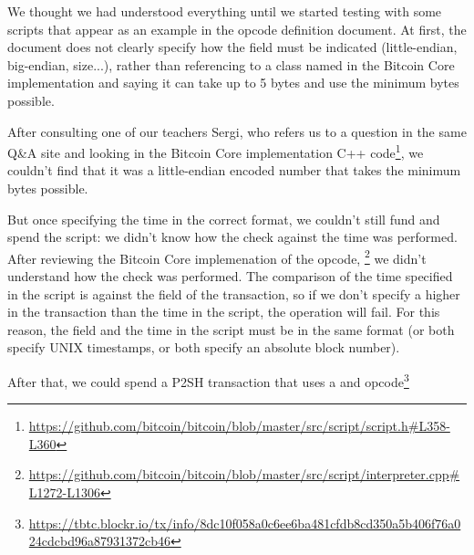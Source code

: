 We thought we had understood everything until we started testing with some scripts that appear as an example in the opcode definition document\cite{bip-65:online}. At first, the document does not clearly specify how the  field must be indicated (little-endian, big-endian, size...), rather than referencing to a class named  in the Bitcoin Core implementation and saying it can take up to 5 bytes and use the minimum bytes possible.

After consulting one of our teachers Sergi, who refers us to a question in the same Q&A site\cite{se-locktime-specification:online} and looking in the Bitcoin Core implementation C++  code\footnote{\url{https://github.com/bitcoin/bitcoin/blob/master/src/script/script.h#L358-L360}}, we couldn't find that it was a little-endian encoded number that takes the minimum bytes possible. 

But once specifying the time in the correct format, we couldn't still fund and spend the script: we didn't know how the check against the time was performed. After reviewing the Bitcoin Core implemenation of the opcode, \footnote{\url{https://github.com/bitcoin/bitcoin/blob/master/src/script/interpreter.cpp#L1272-L1306}} we didn't understand how the check was performed. The comparison of the time specified in the script is against the field  of the transaction, so if we don't specify a higher  in the transaction than the time in the script, the operation  will fail. For this reason, the  field and the time in the script must be in the same format (or both specify UNIX timestamps, or both specify an absolute block number). 

After that, we could spend a P2SH transaction that uses a  and  opcode\footnote{\url{https://tbtc.blockr.io/tx/info/8dc10f058a0c6ee6ba481cfdb8cd350a5b406f76a024cdcbd96a87931372cb46}}

